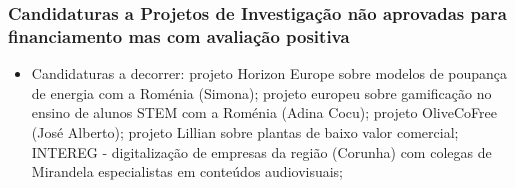 \documentclass[11pt]{article}
\begin{document}
\subsubsection{Candidaturas a Projetos de Investigação não aprovadas para financiamento mas com avaliação positiva}
\begin{itemize}

\item {Candidaturas a decorrer: projeto Horizon Europe sobre modelos de poupança de energia com a Roménia (Simona); projeto europeu sobre gamificação no ensino de alunos STEM com a Roménia (Adina Cocu); projeto OliveCoFree (José Alberto); projeto Lillian sobre plantas de baixo valor comercial; INTEREG - digitalização de empresas da região (Corunha) com colegas de Mirandela especialistas em conteúdos audiovisuais;}


\end{itemize}
\end{document}

